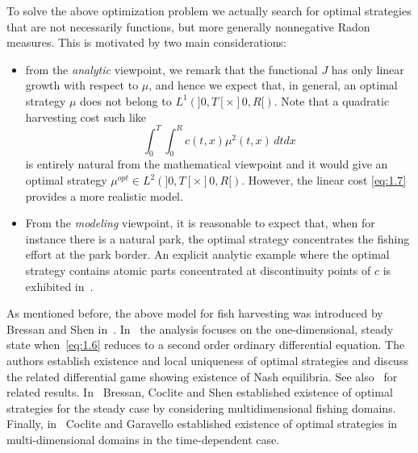 \documentclass[11pt,leqno]{amsart}
\numberwithin{equation}{section}
\begin{document}
To solve the above optimization problem we actually search for optimal strategies that are not necessarily functions, but more generally nonnegative Radon measures. This is motivated by two main considerations:
\begin{itemize}
\item from the \emph{analytic} viewpoint, we remark that the functional $J$ has only linear growth with respect to $\mu$, 
and hence we expect that, in general, an optimal strategy $\mu$ does not belong to $L^1 (]0, T[ \times ]0, R[)$. Note  that a quadratic harvesting 
cost such like  
\begin{equation*}
\int_0^T \! \! \int_0^R c(t,x ) \mu^2(t,x)\, dtdx
\end{equation*}
is entirely natural from the mathematical viewpoint and it would give an optimal strategy  
$\mu^{opt}\in L^2(]0,T[ \times ]0,R[)$. However, the linear cost \eqref{eq:1.7} provides  a more realistic model. 

\item From the \emph{modeling} viewpoint, it is reasonable to expect that, when for instance there is a natural park, the optimal strategy concentrates the fishing effort at the park border. 
An explicit analytic example where the optimal strategy contains atomic parts concentrated at discontinuity points of $c$   is exhibited in~\cite{BS2}. 
\end{itemize}
As mentioned before, the above model for fish harvesting was introduced by Bressan and Shen in~\cite{BS1}. In~\cite{BS1} the analysis focuses on the one-dimensional, steady state when~\eqref{eq:1.6} reduces to a second order ordinary differential equation. The authors establish existence and local uniqueness of optimal strategies and discuss the related differential game showing existence of Nash equilibria. See also~\cite{BS2} for related results. In~\cite{BCS} Bressan, Coclite and Shen established existence of optimal strategies for the steady case by considering multidimensional fishing domains. Finally, in~\cite{CG} Coclite and Garavello established existence of optimal strategies in multi-dimensional domains in the time-dependent case. 
\end{document}
